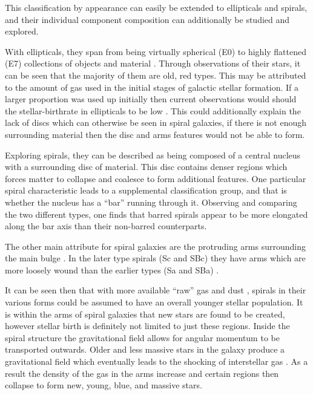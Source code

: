 \documentclass[12pt, twocolumn]{revtex4}    %
\begin{document}
This classification by appearance can easily be extended to ellipticals and spirals, and their individual component composition can additionally be studied and explored. 

With ellipticals, they span from being virtually spherical (E0) to highly flattened (E7) collections of objects and material \citep{moore_databook}. Through observations of their stars, it can be seen that the majority of them are old, red types. This may be attributed to the amount of gas used in the initial stages of galactic stellar formation. If a larger proportion was used up initially then current observations would should the stellar-birthrate in ellipticals to be low \citep{carroll_astro}. This could additionally explain the lack of discs which can otherwise be seen in spiral galaxies, if there is not enough surrounding material then the disc and arms features would not be able to form.

Exploring spirals, they can be described as being composed of a central nucleus with a surrounding disc of material. This disc contains denser regions which forces matter to collapse and coalesce to form additional features. One particular spiral characteristic leads to a supplemental classification group, and that is whether the nucleus has a ``bar'' running through it. Observing and comparing the two different types, one finds that barred spirals appear to be more elongated along the bar axis than their non-barred counterparts. 

The other main attribute for spiral galaxies are the protruding arms surrounding the main bulge \citep{carroll_astro}. In the later type spirals (Sc and SBc) they have arms which are more loosely wound than the earlier types (Sa and SBa) \citep{moore_databook}.

It can be seen then that with more available ``raw'' gas and dust \citep{carroll_astro}, spirals in their various forms could be assumed to have an overall younger stellar population. It is within the arms of spiral galaxies that new stars are found to be created, however stellar birth is definitely not limited to just these regions. Inside the spiral structure the gravitational field allows for angular momentum to be transported outwards. Older and less massive stars in the galaxy produce a gravitational field which eventually leads to the shocking of interstellar gas \citep{binney_galaxies}. As a result the density of the gas in the arms increase and certain regions then collapse to form new, young, blue, and massive stars. 
\end{document}
